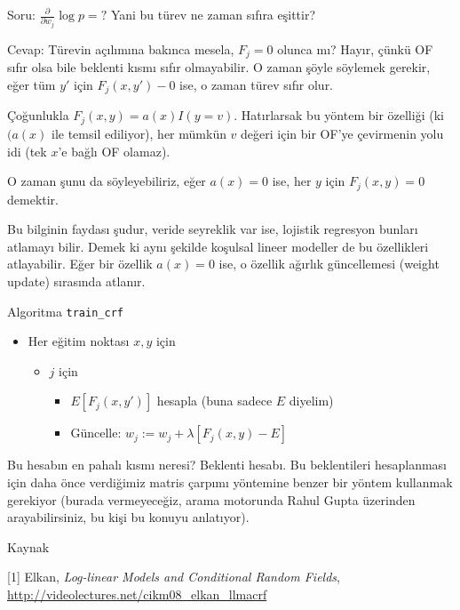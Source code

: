 \documentclass[12pt,fleqn]{article}\usepackage{../../common}
\begin{document}
Soru: $\frac{\partial}{\partial w_j} \log p = ?$ Yani bu türev ne zaman 
sıfıra eşittir? 

Cevap: Türevin açılımına bakınca mesela, $F_j=0$ olunca mı? Hayır, çünkü OF
sıfır olsa bile beklenti kısmı sıfır olmayabilir. O zaman şöyle söylemek
gerekir, eğer tüm $y'$ için $F_j(x,y') - 0$ ise, o zaman türev sıfır olur. 

Çoğunlukla $F_j(x,y) = a(x)I(y=v)$. Hatırlarsak bu yöntem bir özelliği (ki
$(a(x)$ ile temsil ediliyor), her mümkün $v$ değeri için bir OF'ye
çevirmenin yolu idi (tek $x$'e bağlı OF olamaz).

O zaman şunu da söyleyebiliriz, eğer $a(x) = 0$ ise, her $y$ için $F_j(x,y)
= 0$ demektir. 

Bu bilginin faydası şudur, veride seyreklik var ise, lojistik regresyon
bunları atlamayı bilir. Demek ki aynı şekilde koşulsal lineer modeller de
bu özellikleri atlayabilir. Eğer bir özellik $a(x)=0$ ise, o özellik
ağırlık güncellemesi (weight update) sırasında atlanır. 

Algoritma \verb!train_crf!
\begin{itemize}
   \item Her eğitim noktası $x,y$ için
   \begin{itemize}
      \item $j$ için
     \begin{itemize}
       \item $E[F_j(x,y')]$ hesapla (buna sadece $E$ diyelim) 
       \item Güncelle: $w_j := w_j + \lambda[F_j(x,y) - E]$
    \end{itemize}
   \end{itemize}
\end{itemize}

Bu hesabın en pahalı kısmı neresi? Beklenti hesabı. Bu beklentileri
hesaplanması için daha önce verdiğimiz matris çarpımı yöntemine benzer bir
yöntem kullanmak gerekiyor (burada vermeyeceğiz, arama motorunda Rahul
Gupta üzerinden arayabilirsiniz, bu kişi bu konuyu anlatıyor).

Kaynak

[1] Elkan, {\em Log-linear Models and Conditional Random Fields}, 
    \url{http://videolectures.net/cikm08_elkan_llmacrf}
\end{document}
